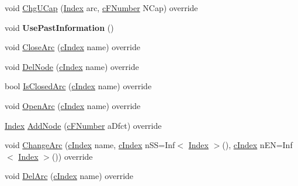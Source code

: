 \begin{DoxyCompactItemize}
\item 
void \mbox{\hyperlink{class_m_c_f_simplex_a00e86718fdd12d417a945d7e146d5b4d}{Chg\+U\+Cap}} (\mbox{\hyperlink{class_m_c_f_class_ad53d6229d7ec28555a9c9c2fd9abf773}{Index}} arc, \mbox{\hyperlink{class_m_c_f_class_a11f747fbdff346237c8db4469d569994}{c\+F\+Number}} N\+Cap) override
\item 
\mbox{\label{class_m_c_f_simplex_abd45ec84be770f575b7d634117b935b3}} 
void {\bfseries Use\+Past\+Information} ()
\item 
void \mbox{\hyperlink{class_m_c_f_simplex_a4a964ce79159307998f5acd0018d01b1}{Close\+Arc}} (\mbox{\hyperlink{class_m_c_f_class_a76aaabb20535c51a2752b93f6c38fe54}{c\+Index}} name) override
\item 
void \mbox{\hyperlink{class_m_c_f_simplex_a61b3f4c0ad2cc61162e944abd43ebd0d}{Del\+Node}} (\mbox{\hyperlink{class_m_c_f_class_a76aaabb20535c51a2752b93f6c38fe54}{c\+Index}} name) override
\item 
bool \mbox{\hyperlink{class_m_c_f_simplex_a95d97fdf20e0075a8deda52f4925072a}{Is\+Closed\+Arc}} (\mbox{\hyperlink{class_m_c_f_class_a76aaabb20535c51a2752b93f6c38fe54}{c\+Index}} name) override
\item 
void \mbox{\hyperlink{class_m_c_f_simplex_af8adf5d3a1f9dfb9c2dd30c170663136}{Open\+Arc}} (\mbox{\hyperlink{class_m_c_f_class_a76aaabb20535c51a2752b93f6c38fe54}{c\+Index}} name) override
\item 
\mbox{\hyperlink{class_m_c_f_class_ad53d6229d7ec28555a9c9c2fd9abf773}{Index}} \mbox{\hyperlink{class_m_c_f_simplex_a3b1944c7daf09b4e72cc2eeda39e335d}{Add\+Node}} (\mbox{\hyperlink{class_m_c_f_class_a11f747fbdff346237c8db4469d569994}{c\+F\+Number}} a\+Dfct) override
\item 
void \mbox{\hyperlink{class_m_c_f_simplex_a23980253602d1183531a93a82d6e7f96}{Change\+Arc}} (\mbox{\hyperlink{class_m_c_f_class_a76aaabb20535c51a2752b93f6c38fe54}{c\+Index}} name, \mbox{\hyperlink{class_m_c_f_class_a76aaabb20535c51a2752b93f6c38fe54}{c\+Index}} n\+SS=Inf$<$ \mbox{\hyperlink{class_m_c_f_class_ad53d6229d7ec28555a9c9c2fd9abf773}{Index}} $>$(), \mbox{\hyperlink{class_m_c_f_class_a76aaabb20535c51a2752b93f6c38fe54}{c\+Index}} n\+EN=Inf$<$ \mbox{\hyperlink{class_m_c_f_class_ad53d6229d7ec28555a9c9c2fd9abf773}{Index}} $>$()) override
\item 
void \mbox{\hyperlink{class_m_c_f_simplex_a3b6145c95b83f40a76d724eb2b92f80f}{Del\+Arc}} (\mbox{\hyperlink{class_m_c_f_class_a76aaabb20535c51a2752b93f6c38fe54}{c\+Index}} name) override

\end{DoxyCompactItemize}
